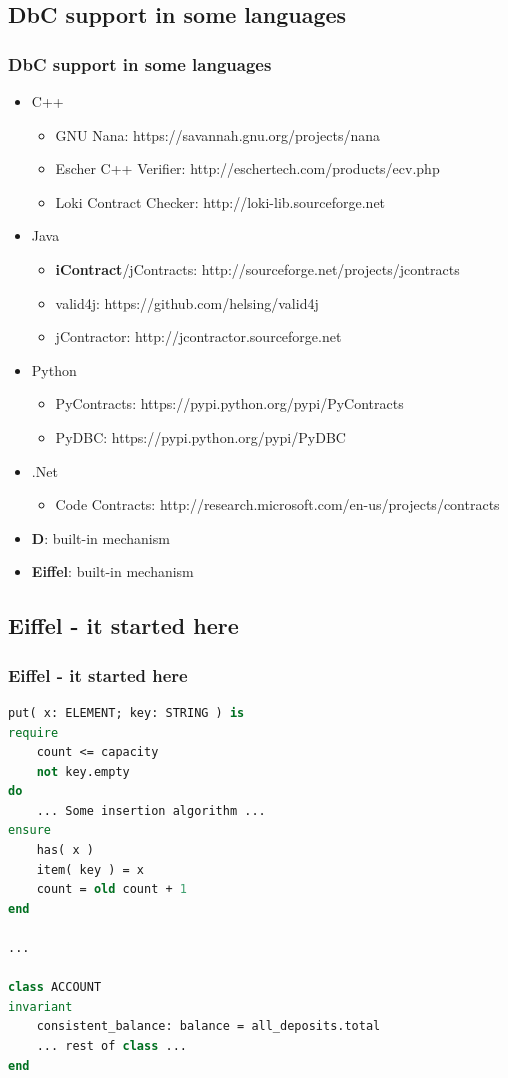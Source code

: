 \documentclass{beamer}
\begin{document}
\subsection{DbC support in some languages}
\begin{frame}
\frametitle{DbC support in some languages}
\begin{itemize}
  \item C++
  \begin{itemize}
    \item GNU Nana: https://savannah.gnu.org/projects/nana
    \item Escher C++ Verifier: http://eschertech.com/products/ecv.php
    \item Loki Contract Checker: http://loki-lib.sourceforge.net
  \end{itemize}
  \item Java
  \begin{itemize}
    \item \textbf{iContract}/jContracts: http://sourceforge.net/projects/jcontracts
    \item valid4j: https://github.com/helsing/valid4j
    \item jContractor: http://jcontractor.sourceforge.net
  \end{itemize}
  \item Python
  \begin{itemize}
    \item PyContracts: https://pypi.python.org/pypi/PyContracts
    \item PyDBC: https://pypi.python.org/pypi/PyDBC
  \end{itemize}
  \item .Net
  \begin{itemize}
    \item Code Contracts: http://research.microsoft.com/en-us/projects/contracts
  \end{itemize}
  \item \textbf{D}: built-in mechanism
  \item \textbf{Eiffel}: built-in mechanism
\end{itemize}
\end{frame}

\subsection{Eiffel - it started here}
\begin{frame}[fragile]
\frametitle{Eiffel - it started here}
\begin{lstlisting}[language=Eiffel,caption=http://www.open-std.org/jtc1/sc22/wg21/docs/papers/2004/n1613.pdf]
put( x: ELEMENT; key: STRING ) is
require
    count <= capacity
    not key.empty
do
    ... Some insertion algorithm ...
ensure
    has( x )
    item( key ) = x
    count = old count + 1
end

...

class ACCOUNT
invariant
    consistent_balance: balance = all_deposits.total
    ... rest of class ...
end
\end{lstlisting}
\end{frame}
\end{document}
